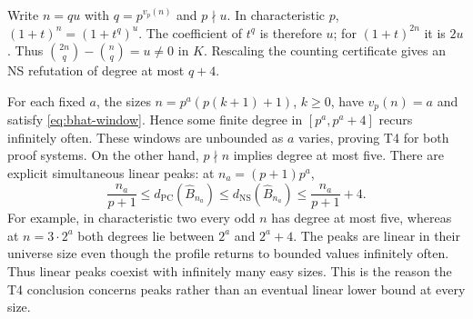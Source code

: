 Write $n=qu$ with $q=p^{v_p(n)}$ and $p\nmid u$. In characteristic
$p$, $(1+t)^n=(1+t^q)^u$. The coefficient of $t^q$ is therefore $u$;
for $(1+t)^{2n}$ it is $2u$. Thus
$\binom{2n}q-\binom nq=u\ne0$ in $K$. Rescaling the counting
certificate gives an NS refutation of degree at most $q+4$.

For each fixed $a$, the sizes $n=p^a(p(k+1)+1)$, $k\geq0$, have
$v_p(n)=a$ and satisfy \eqref{eq:bhat-window}. Hence some finite degree in
$[p^a,p^a+4]$ recurs infinitely often. These windows are unbounded as $a$
varies, proving T4 for both proof systems. On the other hand, $p\nmid n$
implies degree at most five. There are explicit simultaneous linear peaks:
at $n_a=(p+1)p^a$,
\[
 \frac{n_a}{p+1}\leq d_{\mathrm{PC}}(\widehat B_{n_a})
 \leq d_{\mathrm{NS}}(\widehat B_{n_a})
 \leq\frac{n_a}{p+1}+4.
\]
For example, in characteristic two every odd $n$ has degree at most
five, whereas at $n=3\cdot2^a$ both degrees lie between $2^a$ and
$2^a+4$. The peaks are linear in their universe size even though the
profile returns to bounded values infinitely often.
Thus linear peaks coexist with infinitely many easy sizes. This is the
reason the T4 conclusion concerns peaks rather than an eventual linear
lower bound at every size.
